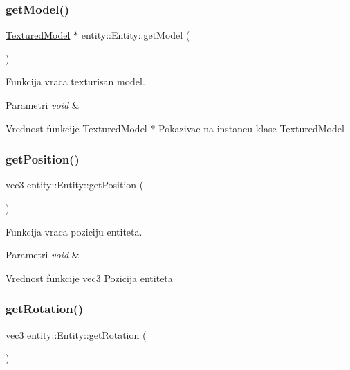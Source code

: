 \subsubsection{\texorpdfstring{get\+Model()}{getModel()}}
{\footnotesize\ttfamily \hyperlink{classmodel_1_1TexturedModel}{Textured\+Model} $\ast$ entity\+::\+Entity\+::get\+Model (\begin{DoxyParamCaption}{ }\end{DoxyParamCaption})}



Funkcija vraca texturisan model. 


\begin{DoxyParams}{Parametri}
{\em void} & \\
\hline
\end{DoxyParams}
\begin{DoxyReturn}{Vrednost funkcije}
Textured\+Model $\ast$ Pokazivac na instancu klase Textured\+Model 
\end{DoxyReturn}
\mbox{\label{classentity_1_1Entity_ad255abb1afcceceb6f2efea66086d8bd}} 
\subsubsection{\texorpdfstring{get\+Position()}{getPosition()}}
{\footnotesize\ttfamily vec3 entity\+::\+Entity\+::get\+Position (\begin{DoxyParamCaption}{ }\end{DoxyParamCaption})}



Funkcija vraca poziciju entiteta. 


\begin{DoxyParams}{Parametri}
{\em void} & \\
\hline
\end{DoxyParams}
\begin{DoxyReturn}{Vrednost funkcije}
vec3 Pozicija entiteta 
\end{DoxyReturn}
\mbox{\label{classentity_1_1Entity_a58680b88c9179d9cab22e881b320f9f7}} 
\subsubsection{\texorpdfstring{get\+Rotation()}{getRotation()}}
{\footnotesize\ttfamily vec3 entity\+::\+Entity\+::get\+Rotation (\begin{DoxyParamCaption}{ }\end{DoxyParamCaption})}




